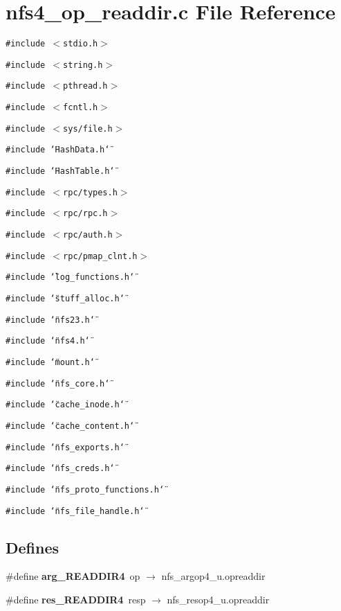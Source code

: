 \section{nfs4\_\-op\_\-readdir.c File Reference}
\label{nfs4__op__readdir_8c}
{\tt \#include $<$stdio.h$>$}\par
{\tt \#include $<$string.h$>$}\par
{\tt \#include $<$pthread.h$>$}\par
{\tt \#include $<$fcntl.h$>$}\par
{\tt \#include $<$sys/file.h$>$}\par
{\tt \#include \char`\"{}HashData.h\char`\"{}}\par
{\tt \#include \char`\"{}HashTable.h\char`\"{}}\par
{\tt \#include $<$rpc/types.h$>$}\par
{\tt \#include $<$rpc/rpc.h$>$}\par
{\tt \#include $<$rpc/auth.h$>$}\par
{\tt \#include $<$rpc/pmap\_\-clnt.h$>$}\par
{\tt \#include \char`\"{}log\_\-functions.h\char`\"{}}\par
{\tt \#include \char`\"{}stuff\_\-alloc.h\char`\"{}}\par
{\tt \#include \char`\"{}nfs23.h\char`\"{}}\par
{\tt \#include \char`\"{}nfs4.h\char`\"{}}\par
{\tt \#include \char`\"{}mount.h\char`\"{}}\par
{\tt \#include \char`\"{}nfs\_\-core.h\char`\"{}}\par
{\tt \#include \char`\"{}cache\_\-inode.h\char`\"{}}\par
{\tt \#include \char`\"{}cache\_\-content.h\char`\"{}}\par
{\tt \#include \char`\"{}nfs\_\-exports.h\char`\"{}}\par
{\tt \#include \char`\"{}nfs\_\-creds.h\char`\"{}}\par
{\tt \#include \char`\"{}nfs\_\-proto\_\-functions.h\char`\"{}}\par
{\tt \#include \char`\"{}nfs\_\-file\_\-handle.h\char`\"{}}\par
\subsection*{Defines}
\begin{CompactItemize}
\item 
\#define {\bf arg\_\-READDIR4}~op $\rightarrow$ nfs\_\-argop4\_\-u.opreaddir
\item 
\#define {\bf res\_\-READDIR4}~resp $\rightarrow$ nfs\_\-resop4\_\-u.opreaddir
\end{CompactItemize}
